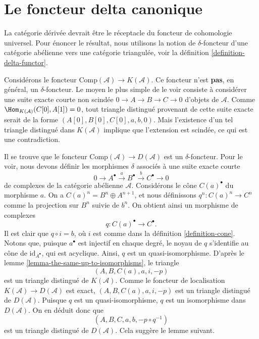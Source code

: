 \section{Le foncteur delta canonique}
\label{section-canonical-delta-functor}

\noindent
La catégorie dérivée devrait être le réceptacle du foncteur de cohomologie
universel. Pour énoncer le résultat, nous utilisons la notion de
$\delta$-foncteur d'une catégorie abélienne vers une catégorie triangulée, voir
la définition \ref{definition-delta-functor}.

\medskip\noindent
Considérons le foncteur $\text{Comp}(\mathcal{A}) \to K(\mathcal{A})$.
Ce foncteur n'est {\bf pas}, en général, un $\delta$-foncteur. Le moyen le plus
simple de le voir consiste à considérer une suite exacte courte non scindée
$0 \to A \to B \to C \to 0$ d'objets de $\mathcal{A}$. Comme
$\Hom_{K(\mathcal{A})}(C[0], A[1]) = 0$, tout triangle distingué provenant de
cette suite exacte serait de la forme
$(A[0], B[0], C[0], a, b, 0)$. Mais l'existence d'un tel triangle distingué
dans $K(\mathcal{A})$ implique que l'extension est scindée, ce qui est une
contradiction.

\medskip\noindent
Il se trouve que le foncteur
$\text{Comp}(\mathcal{A}) \to D(\mathcal{A})$ est un $\delta$-foncteur. Pour
le voir, nous devons définir les morphismes $\delta$ associés à une suite
exacte courte
$$
0 \to A^\bullet \xrightarrow{a} B^\bullet \xrightarrow{b} C^\bullet \to 0
$$
de complexes de la catégorie abélienne $\mathcal{A}$. Considérons le cône
$C(a)^\bullet$ du morphisme $a$. On a
$C(a)^n = B^n \oplus A^{n + 1}$, et nous définissons
$q^n : C(a)^n \to C^n$ comme la projection sur $B^n$ suivie de $b^n$. On
obtient ainsi un morphisme de complexes
$$
q : C(a)^\bullet \longrightarrow C^\bullet.
$$
Il est clair que $q \circ i = b$, où $i$ est comme dans la
définition \ref{definition-cone}. Notons que, puisque $a^\bullet$ est injectif
en chaque degré, le noyau de $q$ s'identifie au cône de
$\text{id}_{A^\bullet}$, qui est acyclique. Ainsi, $q$ est un
quasi-isomorphisme. D'après le
lemme \ref{lemma-the-same-up-to-isomorphisms}, le triangle
$$
(A, B, C(a), a, i, -p)
$$
est un triangle distingué de $K(\mathcal{A})$. Comme le foncteur de
localisation $K(\mathcal{A}) \to D(\mathcal{A})$ est exact,
$(A, B, C(a), a, i, -p)$ est un triangle distingué de $D(\mathcal{A})$.
Puisque $q$ est un quasi-isomorphisme, $q$ est un isomorphisme dans
$D(\mathcal{A})$. On en déduit donc que
$$
(A, B, C, a, b, -p \circ q^{-1})
$$
est un triangle distingué de $D(\mathcal{A})$. Cela suggère le lemme suivant.


